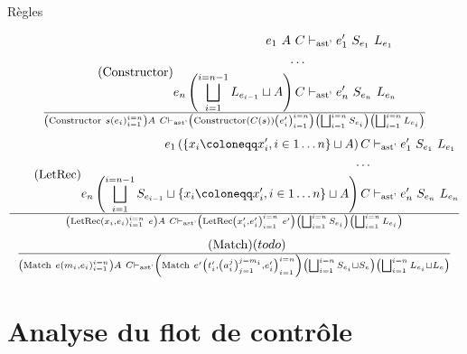 \documentclass{beamer}
\begin{document}
\begin{frame}{Règles}
\begin{gather}
     \end{gather}
     \begin{gather}
        \tag{Constructor}
        \begin{split}
           e_1 ~ A ~ C &\vdash_{\text{ast'}} e_1' ~ S_{e_1} ~ L_{e_1} \\
           \dots \\
           e_n \left( \bigsqcup_{i=1}^{i=n-1} L_{e_{i-1}} \sqcup A \right) C &\vdash_{\text{ast'}} e_n' ~ S_{e_n} ~ L_{e_n}
        \end{split}
        \over \left( \text{Constructor} ~ s \left( e_i \right)_{i=1}^{i=n} \right) A ~ C \vdash_{\text{ast'}} \left( \text{Constructor} \left( C(s) \right) \left( e_i' \right)_{i=1}^{i=n} \right) \left( \bigsqcup_{i=1}^{i=n} S_{e_i} \right) \left( \bigsqcup_{i=1}^{i=n} L_{e_i} \right)
     \end{gather}
     \begin{gather}
        \tag{LetRec}
        \begin{split}
           e_1 \left( \lbrace x_i \coloneqq x_i', i \in 1 \dots n \rbrace \sqcup A \right) C &\vdash_{\text{ast'}} e_1' ~ S_{e_1} ~ L_{e_1} \\
           \dots \\
           e_n \left( \bigsqcup_{i=1}^{i=n-1} S_{e_{i-1}} \sqcup \lbrace x_i \coloneqq x_i', i \in 1 \dots n \rbrace \sqcup A \right) C &\vdash_{\text{ast'}} e_n' ~ S_{e_n} ~ L_{e_n}
        \end{split}
        \over \left( \text{LetRec} \left( x_i, e_i \right)_{i=1}^{i=n} ~ e \right) A ~ C \vdash_{\text{ast'}} \left( \text{LetRec} \left( x_i', e_i' \right)_{i=1}^{i=n} ~ e' \right) \left( \bigsqcup_{i=1}^{i=n} S_{e_i} \right) \left( \bigsqcup_{i=1}^{i=n} L_{e_i} \right)
     \end{gather}
     \begin{gather}
        \tag{Match}
        \begin{split}
        (todo)
        \end{split}
        \over \left( \text{Match} ~ e \left( m_i, e_i \right)_{i=1}^{i=n} \right) A ~ C \vdash_{\text{ast'}} \left( \text{Match} ~ e' \left( t_i', \left( a_i^j \right)_{j=1}^{j=m_i}, e_i' \right)_{i=1}^{i=n}\right) \left( \bigsqcup_{i=1}^{i=n} S_{e_i} \sqcup S_{e} \right) \left( \bigsqcup_{i=1}^{i=n} L_{e_i} \sqcup L_{e} \right)
     \end{gather}
\end{frame}
\fi

\section{Analyse du flot de contrôle}
\end{document}
